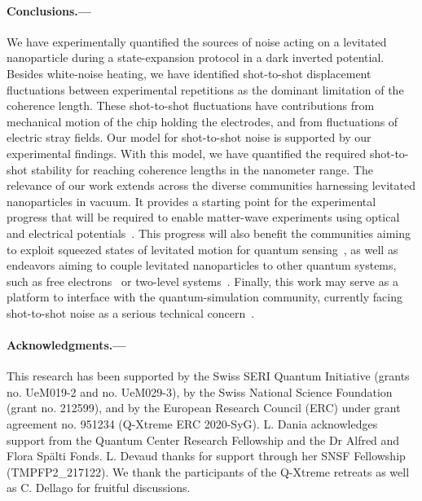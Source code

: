\documentclass[aps,prl,reprint,twocolumn,superscriptaddress]{revtex4-2}
\begin{document}
\paragraph{Conclusions.---}
We have experimentally quantified the sources of noise acting on a levitated nanoparticle during a state-expansion protocol in a dark inverted potential. 
Besides white-noise heating, we have identified shot-to-shot displacement fluctuations between experimental repetitions as the dominant limitation of the coherence length.
These shot-to-shot fluctuations have contributions from mechanical motion of the chip holding the electrodes, and from fluctuations of electric stray fields.
Our model for shot-to-shot noise is supported by our experimental findings. 
With this model, we have quantified the required shot-to-shot stability for reaching coherence lengths in the nanometer range. 
The relevance of our work extends across the diverse communities harnessing levitated nanoparticles in vacuum. 
It provides a starting point for the experimental progress that will be required to enable matter-wave experiments using optical and electrical potentials~\cite{romero2011quantumsuperposition,Romero-Isart2011largeQuantum_PRL,rodallordes2024macroscopic,neumeier2024fast,Bateman2014near-fieldNatComm}. 
This progress will also benefit the communities aiming to exploit squeezed states of levitated motion for quantum sensing~\cite{Weiss2021largequantum,Cosco2021enhancedPRA,rossi2024quantum,Kamba2025quantum}, as well as endeavors aiming to couple levitated nanoparticles to other quantum systems, such as free electrons~\cite{Nimmrichter2025electron-enabled} or two-level systems~\cite{Wan2016PRLfreeNano,Bykov2025nanoparticlePRL}.
Finally, this work may serve as a platform to interface with the quantum-simulation community, currently facing shot-to-shot noise as a serious technical concern~\cite{Steckmann2025error}.




\paragraph{Acknowledgments.---}
This research has been supported by the Swiss SERI Quantum Initiative (grants no. UeM019-2 and no. UeM029-3), by the Swiss National Science Foundation (grant no. 212599), and by the European Research Council (ERC) under grant agreement no. 951234 (Q-Xtreme ERC 2020-SyG). L. Dania acknowledges support from the Quantum Center Research Fellowship and the Dr Alfred and Flora Spälti Fonds. L. Devaud thanks for support through her SNSF Fellowship (TMPFP2\_217122). We thank the participants of the Q-Xtreme retreats as well as C. Dellago for fruitful discussions.
 


\end{document}
